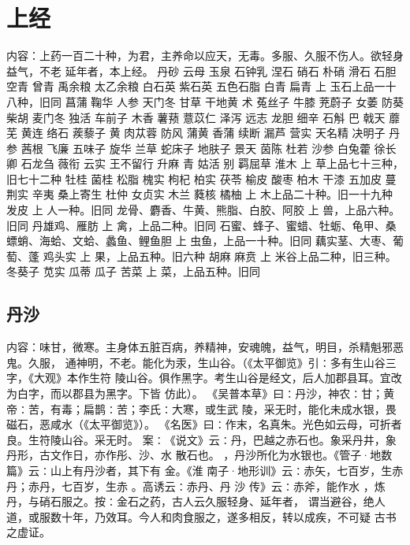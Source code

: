 \documentclass[12pt,UTF8]{ctexbook}
\begin{document}
\part{上经}

内容：上药一百二十种，为君，主养命以应天，无毒。多服、久服不伤人。欲轻身益气，不老 
延年者，本上经。 
丹砂 云母 玉泉 石钟乳 涅石 硝石 朴硝 滑石 石胆 空青 曾青 禹余粮 
太乙余粮 白石英 紫石英 五色石脂 白青 扁青 
上 玉石上品一十八种，旧同 
菖蒲 鞠华 人参 天门冬 甘草 干地黄 术 菟丝子 牛膝 茺蔚子 女萎 防葵 
柴胡 麦门冬 独活 车前子 木香 薯蓣 薏苡仁 泽泻 远志 龙胆 细辛 石斛 巴 
戟天 
蘼芜 黄连 络石 蒺藜子 黄 肉苁蓉 防风 蒲黄 香蒲 续断 漏芦 营实 
天名精 决明子 丹参 茜根 飞廉 五味子 旋华 兰草 蛇床子 地肤子 景天 茵陈 
杜若 沙参 白兔藿 徐长卿 石龙刍 薇衔 云实 王不留行 升麻 青 姑活 别 
羁屈草 淮木 
上 草上品七十三种，旧七十二种 
牡桂 菌桂 松脂 槐实 枸杞 柏实 茯苓 榆皮 酸枣 柏木 干漆 五加皮 蔓 
荆实 辛夷 桑上寄生 杜仲 女贞实 木兰 蕤核 橘柚 
上 木上品二十种。旧一十九种 
发皮 
上 人一种。旧同 
龙骨、麝香、牛黄、熊脂、白胶、阿胶 
上 兽，上品六种。旧同 
丹雄鸡、雁肪 
上 禽，上品二种。旧同 
石蜜、蜂子、蜜蜡、牡蛎、龟甲、桑螵蛸、海蛤、文蛤、蠡鱼、鲤鱼胆 
上 虫鱼，上品一十种。旧同 
藕实茎、大枣、葡萄、蓬 鸡头实 
上 果，上品五种。旧六种 
胡麻 麻贲 
上 米谷上品二种，旧三种。 
冬葵子 苋实 瓜蒂 瓜子 苦菜 
上 菜，上品五种。旧同 

\chapter{丹沙}

内容：味甘，微寒。主身体五脏百病，养精神，安魂魄，益气，明目，杀精魁邪恶鬼。久服， 
通神明，不老。能化为汞，生山谷。（《太平御览》引∶多有生山谷三字，《大观》本作生符 
陵山谷。俱作黑字。考生山谷是经文，后人加郡县耳。宜改为白字，而以郡县为黑字。下皆 
仿此）。 
《吴普本草》曰∶丹沙，神农∶甘；黄帝∶苦，有毒；扁鹊∶苦；李氏∶大寒，或生武 
陵，采无时，能化未成水银，畏磁石，恶咸水（《太平御览》）。 
《名医》曰∶作末，名真朱。光色如云母，可折者良。生符陵山谷。采无时。 
案∶《说文》云∶丹，巴越之赤石也。象采丹井，象丹形，古文作日，亦作彤、沙、水 
散石也。 ，丹沙所化为水银也。《管子·地数篇》云∶山上有丹沙者，其下有 金。《淮 
南子·地形训》云∶赤矢，七百岁，生赤丹；赤丹，七百岁，生赤 。高诱云∶赤丹、丹 
沙 
传》云∶赤斧，能作水 ，炼丹，与硝石服之。按∶金石之药，古人云久服轻身、延年者， 
谓当避谷，绝人道，或服数十年，乃效耳。今人和肉食服之，遂多相反，转以成疾，不可疑 
古书之虚证。 
\end{document}
